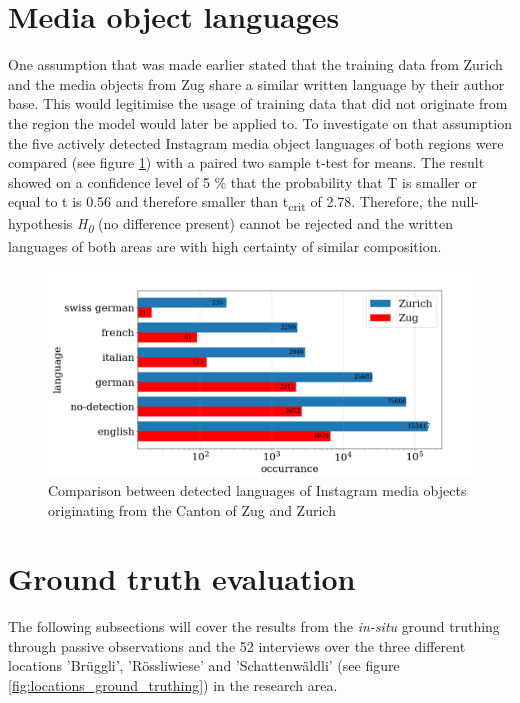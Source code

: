 \section{Media object languages}
One assumption that was made earlier stated that the training data from Zurich and the media objects from Zug share a similar written language by their author base. This would legitimise the usage of training data that did not originate from the region the model would later be applied to. To investigate on that assumption the five actively detected Instagram media object languages of both regions were compared (see figure \ref{fig:det_languages}) with a paired two sample t-test for means. The result showed on a confidence level of 5 \% that the probability that T is smaller or equal to t is 0.56 and therefore smaller than t\textsubscript{crit} of 2.78. Therefore, the null-hypothesis \textit{H\textsubscript{0}} (no difference present) cannot be rejected and the written languages of both areas are with high certainty of similar composition.

\begin{figure}[!htb]
   \centering
   \includegraphics[width=\textwidth]{img/det_languages_bigger_font.pdf}
   \caption{Comparison between detected languages of Instagram media objects originating from the Canton of Zug and Zurich}
   \label{fig:det_languages}
\end{figure}

\section{Ground truth evaluation}
The following subsections will cover the results from the \textit{in-situ} ground truthing through passive observations and the 52 interviews over the three different locations 'Br\"uggli', 'R\"ossliwiese' and 'Schattenw\"aldli' (see figure \ref{fig:locations_ground_truthing}) in the research area. \\

